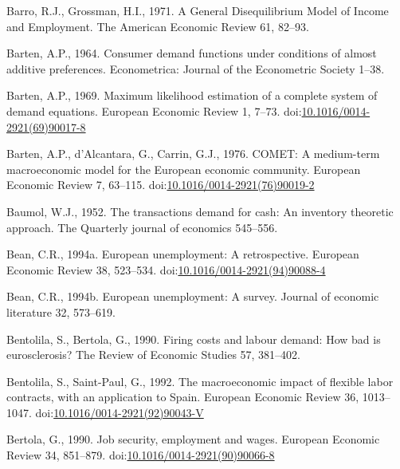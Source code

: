 \documentclass[
  12pt,
  onecolumn]{article}
\newlength{\cslhangindent}
\newlength{\cslentryspacingunit} %
\newenvironment{CSLReferences}[2] %
 {%
  \setlength{\parindent}{0pt}
  \ifodd #1
  \let\oldpar\par
  \def\par{\hangindent=\cslhangindent\oldpar}
  \fi
  \setlength{\parskip}{#2\cslentryspacingunit}
 }%
 {}
\begin{document}
\begin{CSLReferences}{1}{0}
\leavevmode{}%
Barro, R.J., Grossman, H.I., 1971. A {General Disequilibrium Model} of
{Income} and {Employment}. The American Economic Review 61, 82--93.

\leavevmode{}%
Barten, A.P., 1964. Consumer demand functions under conditions of almost
additive preferences. Econometrica: Journal of the Econometric Society
1--38.

\leavevmode{}%
Barten, A.P., 1969. Maximum likelihood estimation of a complete system
of demand equations. European Economic Review 1, 7--73.
doi:\href{https://doi.org/10.1016/0014-2921(69)90017-8}{10.1016/0014-2921(69)90017-8}

\leavevmode{}%
Barten, A.P., d'Alcantara, G., Carrin, G.J., 1976. {COMET}: {A}
medium-term macroeconomic model for the {European} economic community.
European Economic Review 7, 63--115.
doi:\href{https://doi.org/10.1016/0014-2921(76)90019-2}{10.1016/0014-2921(76)90019-2}

\leavevmode{}%
Baumol, W.J., 1952. The transactions demand for cash: {An} inventory
theoretic approach. The Quarterly journal of economics 545--556.

\leavevmode{}%
Bean, C.R., 1994a. European unemployment: {A} retrospective. European
Economic Review 38, 523--534.
doi:\href{https://doi.org/10.1016/0014-2921(94)90088-4}{10.1016/0014-2921(94)90088-4}

\leavevmode{}%
Bean, C.R., 1994b. European unemployment: A survey. Journal of economic
literature 32, 573--619.

\leavevmode{}%
Bentolila, S., Bertola, G., 1990. Firing costs and labour demand: How
bad is eurosclerosis? The Review of Economic Studies 57, 381--402.

\leavevmode{}%
Bentolila, S., Saint-Paul, G., 1992. The macroeconomic impact of
flexible labor contracts, with an application to {Spain}. European
Economic Review 36, 1013--1047.
doi:\href{https://doi.org/10.1016/0014-2921(92)90043-V}{10.1016/0014-2921(92)90043-V}

\leavevmode{}%
Bertola, G., 1990. Job security, employment and wages. European Economic
Review 34, 851--879.
doi:\href{https://doi.org/10.1016/0014-2921(90)90066-8}{10.1016/0014-2921(90)90066-8}


\end{CSLReferences}
\end{document}
